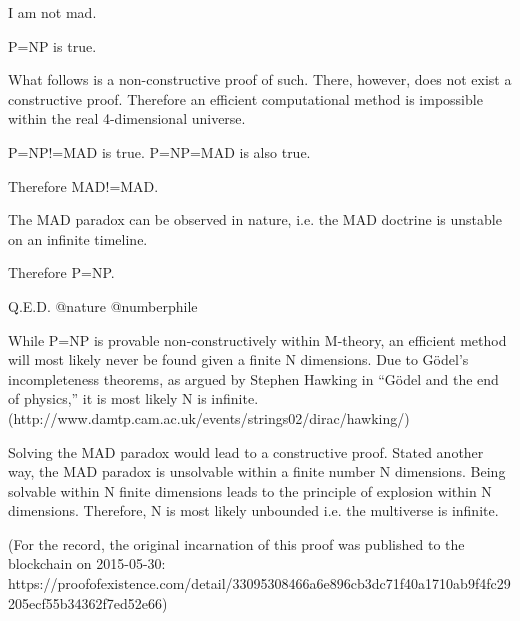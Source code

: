 I am not mad.

P=NP is true.

What follows is a non-constructive proof of such. There, however, does not exist a constructive proof. Therefore an efficient computational method is impossible within the real 4-dimensional universe.

P=NP!=MAD is true.
P=NP=MAD is also true.

Therefore MAD!=MAD.

The MAD paradox can be observed in nature, i.e. the MAD doctrine is unstable on an infinite timeline.

Therefore P=NP.

Q.E.D. @nature @numberphile

While P=NP is provable non-constructively within M-theory, an efficient method will most likely never be found given a finite N dimensions. Due to Gödel's incompleteness theorems, as argued by Stephen Hawking in “Gödel and the end of physics,” it is most likely N is infinite. (http://www.damtp.cam.ac.uk/events/strings02/dirac/hawking/)

Solving the MAD paradox would lead to a constructive proof. Stated another way, the MAD paradox is unsolvable within a finite number N dimensions. Being solvable within N finite dimensions leads to the principle of explosion within N dimensions. Therefore, N is most likely unbounded i.e. the multiverse is infinite.

(For the record, the original incarnation of this proof was published to the blockchain on 2015-05-30: https://proofofexistence.com/detail/33095308466a6e896cb3dc71f40a1710ab9f4fc29205ecf55b34362f7ed52e66)
